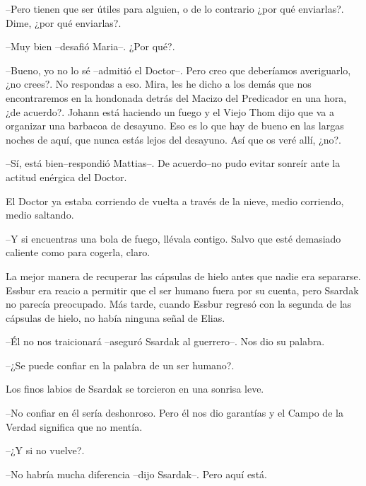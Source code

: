 --Pero tienen que ser útiles para alguien, o de lo contrario ¿por qué enviarlas?. Dime, ¿por qué enviarlas?.



--Muy bien --desafió Maria--. ¿Por qué?.



--Bueno, yo no lo sé --admitió el Doctor--. Pero creo que deberíamos averiguarlo, ¿no crees?. No respondas a eso. Mira, les he dicho a los demás que nos encontraremos en la hondonada detrás del Macizo del Predicador en una hora, ¿de acuerdo?. Johann está haciendo un fuego y el Viejo Thom dijo que va a organizar una barbacoa de desayuno. Eso es lo que hay de bueno en las largas noches de aquí, que nunca estás lejos del desayuno. Así que os veré allí, ¿no?.



--Sí, está bien--respondió Mattias--. De acuerdo--no pudo evitar sonreír ante la actitud enérgica del Doctor.



El Doctor ya estaba corriendo de vuelta a través de la nieve, medio corriendo, medio saltando. 


--Y si encuentras una bola de fuego, llévala contigo. Salvo que esté demasiado caliente como para cogerla, claro.



\mbox{}



La mejor manera de recuperar las cápsulas de hielo antes que nadie era separarse. Essbur era reacio a permitir que el ser humano fuera por su cuenta, pero Ssardak no parecía preocupado. Más tarde, cuando Essbur regresó con la segunda de las cápsulas de hielo, no había ninguna señal de Elias.



--Él no nos traicionará --aseguró Ssardak al guerrero--. Nos dio su palabra.



--¿Se puede confiar en la palabra de un ser humano?.



Los finos labios de Ssardak se torcieron en una sonrisa leve. 


--No confiar en él sería deshonroso. Pero él nos dio garantías y el Campo de la Verdad significa que no mentía.



--¿Y si no vuelve?.



--No habría mucha diferencia --dijo Ssardak--. Pero aquí está.



